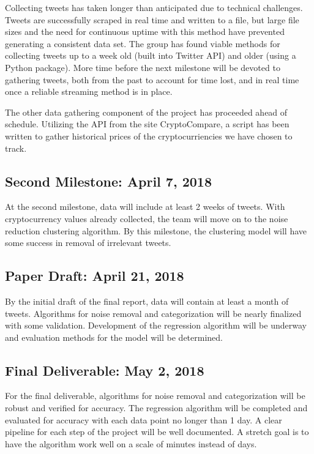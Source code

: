 \documentclass[sigconf]{acmart}
\begin{document}
Collecting tweets has taken longer than anticipated due to technical challenges. Tweets are successfully scraped in real time and written to a file, but large file sizes and the need for continuous uptime with this method have prevented generating a consistent data set. The group has found viable methods for collecting tweets up to a week old (built into Twitter API) and older (using a Python package). More time before the next milestone will be devoted to gathering tweets, both from the past to account for time lost, and in real time once a reliable streaming method is in place.

The other data gathering component of the project has proceeded ahead of schedule. Utilizing the API from the site CryptoCompare, a script has been written to gather historical prices of the cryptocurriencies we have chosen to track.

\subsection{Second Milestone: April 7, 2018}

At the second milestone, data will include at least 2 weeks of
tweets. With cryptocurrency values already collected, the team will move on to the noise reduction clustering algorithm. By this milestone, the clustering model will have some success in removal of irrelevant tweets.

\subsection{Paper Draft: April 21, 2018}

By the initial draft of the final report, data will contain at least a month of tweets. Algorithms for noise removal and categorization will be nearly finalized with some validation. Development of the regression algorithm will be underway and evaluation methods for the model will be determined.

\subsection{Final Deliverable: May 2, 2018}

For the final deliverable, algorithms for noise removal and categorization will be robust and verified for accuracy. The regression algorithm will be completed and evaluated for accuracy with each data point no longer than 1 day. A clear pipeline for each step of the project will be well documented. A stretch goal is to have the algorithm work well on a scale of minutes instead of days.



\end{document}
